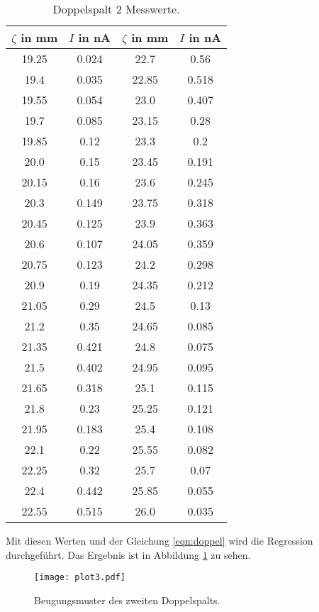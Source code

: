 \begin{table}
  \centering
  \caption{Doppelspalt 2 Messwerte.}
  \label{tab:doppel2}
\begin{tabular}{c c | c c}
  \toprule
  $\zeta$ in mm & $I$ in nA & $\zeta$ in mm & $I$ in nA \\
  \midrule
  19.25  &  0.024  &  22.7  &  0.56 \\
  19.4  &  0.035  &  22.85  &  0.518 \\
  19.55  &  0.054  &  23.0  &  0.407 \\
  19.7  &  0.085  &  23.15  &  0.28 \\
  19.85  &  0.12  &  23.3  &  0.2 \\
  20.0  &  0.15  &  23.45  &  0.191 \\
  20.15  &  0.16  &  23.6  &  0.245 \\
  20.3  &  0.149  &  23.75  &  0.318 \\
  20.45  &  0.125  &  23.9  &  0.363 \\
  20.6  &  0.107  &  24.05  &  0.359 \\
  20.75  &  0.123  &  24.2  &  0.298 \\
  20.9  &  0.19  &  24.35  &  0.212 \\
  21.05  &  0.29  &  24.5  &  0.13 \\
  21.2  &  0.35  &  24.65  &  0.085 \\
  21.35  &  0.421  &  24.8  &  0.075 \\
  21.5  &  0.402  &  24.95  &  0.095 \\
  21.65  &  0.318  &  25.1  &  0.115 \\
  21.8  &  0.23  &  25.25  &  0.121 \\
  21.95  &  0.183  &  25.4  &  0.108 \\
  22.1  &  0.22  &  25.55  &  0.082 \\
  22.25  &  0.32  &  25.7  &  0.07 \\
  22.4  &  0.442  &  25.85  &  0.055 \\
  22.55  &  0.515  &  26.0  &  0.035 \\
  \bottomrule
\end{tabular}
\end{table}
\FloatBarrier

Mit diesen Werten und der Gleichung \eqref{eqn:doppel} wird die Regression durchgeführt.
Das Ergebnis ist in Abbildung \ref{fig:plot3} zu sehen.

\begin{figure}
  \centering
  \texttt{[image: plot3.pdf]}
  \caption{Beugungsmuster des zweiten Doppelspalts.}
  \label{fig:plot3}
\end{figure}
\FloatBarrier

